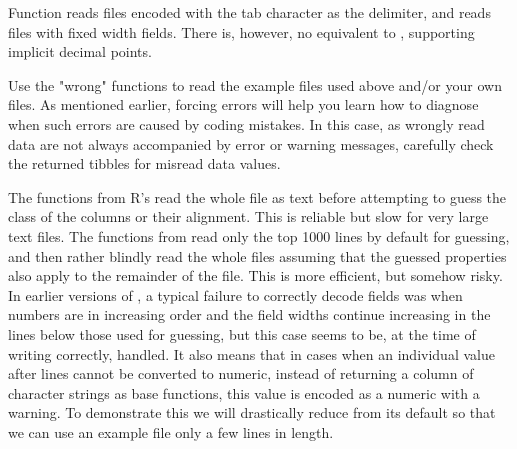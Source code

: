 \documentclass[krantz2]{krantz}\usepackage{knitr}
\begin{document}
Function  reads files encoded with the tab character as the delimiter, and  reads files with fixed width fields. There is, however, no equivalent to , supporting implicit decimal points.

\begin{playground}
Use the "wrong"  functions to read the example files used above and/or your own files. As mentioned earlier, forcing errors will help you learn how to diagnose when such errors are caused by coding mistakes. In this case, as wrongly read data are not always accompanied by error or warning messages, carefully check the returned tibbles for misread data values.
\end{playground}

\begin{explainbox}
The functions from R's  read the whole file as text before attempting to guess the class of the columns or their alignment. This is reliable but slow for very large text files. The functions from  read only the top 1000 lines by default for guessing, and then rather blindly read the whole files assuming that the guessed properties also apply to the remainder of the file. This is more efficient, but somehow risky. In earlier versions of , a typical failure to correctly decode fields was when numbers are in increasing order and the field widths continue increasing in the lines below those used for guessing, but this case seems to be, at the time of writing correctly, handled. It also means that in cases when an individual value after  lines cannot be converted to numeric, instead of returning a column of character strings as base \Rpgrm functions, this value is encoded as a numeric  with a warning. To demonstrate this we will drastically reduce  from its default so that we can use an example file only a few lines in length.



\begin{knitrout}\footnotesize
{}\color{fgcolor}\begin{kframe}
\begin{alltt}
\hlstd{(} \hlstd{=} \hlstd{)}
\end{alltt}



\end{kframe}
\end{knitrout}
\end{explainbox}
\end{document}
